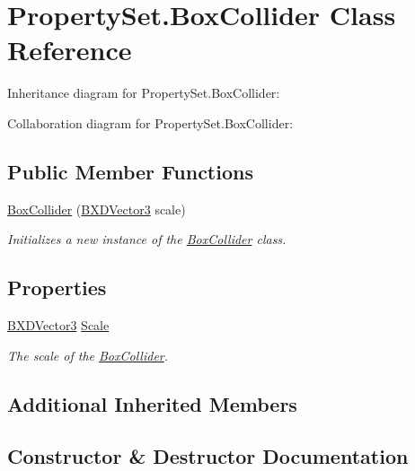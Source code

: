 \hypertarget{class_property_set_1_1_box_collider}{}\section{Property\+Set.\+Box\+Collider Class Reference}
\label{class_property_set_1_1_box_collider}


Inheritance diagram for Property\+Set.\+Box\+Collider\+:


Collaboration diagram for Property\+Set.\+Box\+Collider\+:
\subsection*{Public Member Functions}
\begin{DoxyCompactItemize}
\item 
\hyperlink{class_property_set_1_1_box_collider_af1689637045a1715e6bb07c83e7e7a65}{Box\+Collider} (\hyperlink{class_b_x_d_vector3}{B\+X\+D\+Vector3} scale)
\begin{DoxyCompactList}\small\item\em Initializes a new instance of the \hyperlink{class_property_set_1_1_box_collider}{Box\+Collider} class. \end{DoxyCompactList}\end{DoxyCompactItemize}
\subsection*{Properties}
\begin{DoxyCompactItemize}
\item 
\hyperlink{class_b_x_d_vector3}{B\+X\+D\+Vector3} \hyperlink{class_property_set_1_1_box_collider_aa77e5fea4e959ffde2763e74383ac70f}{Scale}
\begin{DoxyCompactList}\small\item\em The scale of the \hyperlink{class_property_set_1_1_box_collider}{Box\+Collider}. \end{DoxyCompactList}\end{DoxyCompactItemize}
\subsection*{Additional Inherited Members}


\subsection{Constructor \& Destructor Documentation}
\mbox{\label{class_property_set_1_1_box_collider_af1689637045a1715e6bb07c83e7e7a65}} 
